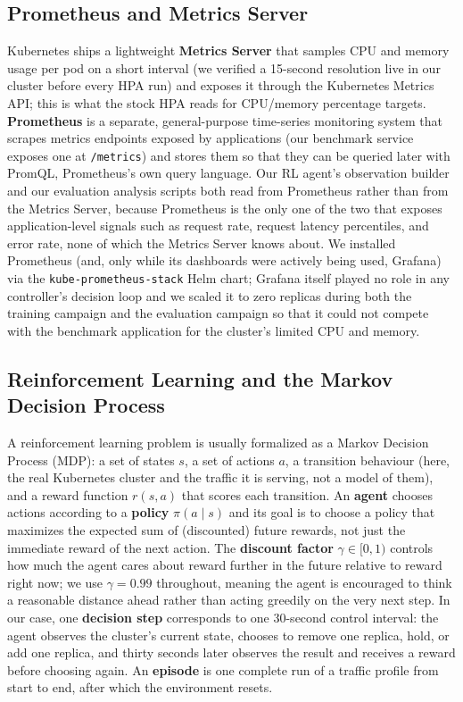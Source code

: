 \subsection{Prometheus and Metrics Server}

Kubernetes ships a lightweight \textbf{Metrics Server} that samples CPU and
memory usage per pod on a short interval (we verified a 15-second resolution
live in our cluster before every HPA run) and exposes it through the
Kubernetes Metrics API; this is what the stock HPA reads for CPU/memory
percentage targets. \textbf{Prometheus} is a separate, general-purpose
time-series monitoring system that scrapes metrics endpoints exposed by
applications (our benchmark service exposes one at \texttt{/\allowbreak \allowbreak metrics}) and
stores them so that they can be queried later with PromQL, Prometheus's own
query language. Our RL agent's observation builder and our evaluation
analysis scripts both read from Prometheus rather than from the Metrics
Server, because Prometheus is the only one of the two that exposes
application-level signals such as request rate, request latency
percentiles, and error rate, none of which the Metrics Server knows about.
We installed Prometheus (and, only while its dashboards were actively being
used, Grafana) via the \texttt{kube-prometheus-stack} Helm chart; Grafana
itself played no role in any controller's decision loop and we scaled it to
zero replicas during both the training campaign and the evaluation campaign
so that it could not compete with the benchmark application for the
cluster's limited CPU and memory.

\subsection{Reinforcement Learning and the Markov Decision Process}

A reinforcement learning problem is usually formalized as a Markov Decision
Process (MDP): a set of states $s$, a set of actions $a$, a transition
behaviour (here, the real Kubernetes cluster and the traffic it is serving,
not a model of them), and a reward function $r(s,a)$ that scores each
transition. An \textbf{agent} chooses actions according to a
\textbf{policy} $\pi(a \mid s)$ and its goal is to choose a policy that
maximizes the expected sum of (discounted) future rewards, not just the
immediate reward of the next action. The \textbf{discount factor} $\gamma
\in [0,1)$ controls how much the agent cares about reward further in the
future relative to reward right now; we use $\gamma = 0.99$ throughout,
meaning the agent is encouraged to think a reasonable distance ahead rather
than acting greedily on the very next step. In our case, one
\textbf{decision step} corresponds to one 30-second control interval: the
agent observes the cluster's current state, chooses to remove one replica,
hold, or add one replica, and thirty seconds later observes the result and
receives a reward before choosing again. An \textbf{episode} is one
complete run of a traffic profile from start to end, after which the
environment resets.

